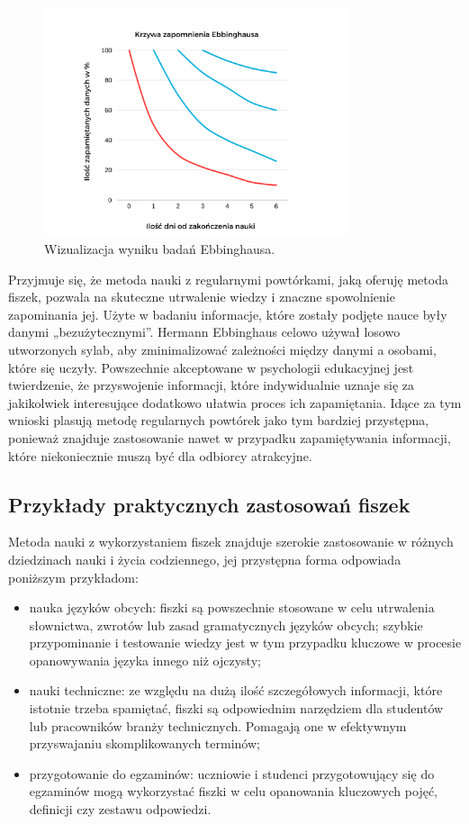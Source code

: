 \begin{figure}[H]
    \centering
    \includegraphics[width=0.8\textwidth]{chapters/chapter_2/krzywa2.png}
    \caption{Wizualizacja wyniku badań Ebbinghausa.}
    \label{img:krzywa2}
\end{figure}


Przyjmuje się, że metoda nauki z regularnymi powtórkami, jaką oferuję metoda fiszek, pozwala na skuteczne utrwalenie wiedzy i znaczne spowolnienie zapominania jej. Użyte w badaniu informacje, które zostały podjęte nauce były danymi „bezużytecznymi”. Hermann Ebbinghaus celowo używał losowo utworzonych sylab, aby zminimalizować zależności między danymi a osobami, które się uczyły. Powszechnie akceptowane w psychologii edukacyjnej jest twierdzenie, że przyswojenie informacji, które indywidualnie uznaje się za jakikolwiek interesujące dodatkowo ułatwia proces ich zapamiętania. Idące za tym wnioski plasują metodę regularnych powtórek jako tym bardziej przystępna, ponieważ znajduje zastosowanie nawet w przypadku zapamiętywania informacji, które niekoniecznie muszą być dla odbiorcy atrakcyjne.

\subsection{Przykłady praktycznych zastosowań fiszek}

Metoda nauki z wykorzystaniem fiszek znajduje szerokie zastosowanie w różnych dziedzinach nauki i życia codziennego, jej przystępna forma odpowiada poniższym przykładom:
\begin{itemize}
    \item nauka języków obcych: fiszki są powszechnie stosowane w celu utrwalenia słownictwa, zwrotów lub zasad gramatycznych języków obcych; szybkie przypominanie i testowanie wiedzy jest w tym przypadku kluczowe w procesie opanowywania języka innego niż ojczysty;
    \item nauki techniczne: ze względu na dużą ilość szczegółowych informacji, które istotnie trzeba spamiętać, fiszki są odpowiednim narzędziem dla studentów lub pracowników branży technicznych. Pomagają one w efektywnym przyswajaniu skomplikowanych terminów;
    \item przygotowanie do egzaminów: uczniowie i studenci przygotowujący się do egzaminów mogą wykorzystać fiszki w celu opanowania kluczowych pojęć, definicji czy zestawu odpowiedzi.
\end{itemize}

